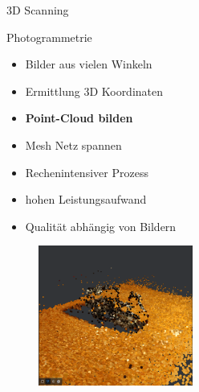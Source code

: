 \begin{frame}{3D Scanning}
\begin{minipage}[m]{.49\textwidth}
    \begin{block}{Photogrammetrie}
        \begin{itemize}
            \item Bilder aus vielen Winkeln
            \item Ermittlung 3D Koordinaten
            \item \textbf{Point-Cloud bilden}
            \item Mesh Netz spannen
            \item Rechenintensiver Prozess
            \item hohen Leistungsaufwand
            \item Qualität abhängig von Bildern
        \end{itemize}  
    \end{block}
    \end{minipage}
    \begin{minipage}[]{.49\textwidth}
        \begin{figure}[]
          \includegraphics[height=130pt]{img_niklas/image_anlasserPointCloud.PNG}
          \label{fig:my_label}
      \end{figure}    
    \end{minipage}
    
  
\end{frame}

